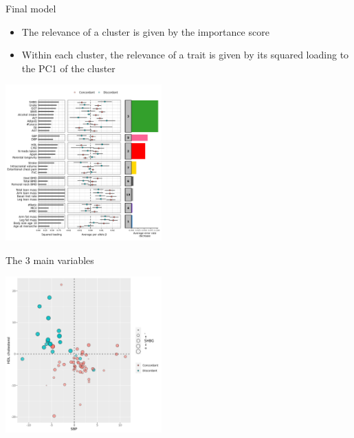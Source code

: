 \documentclass[presentation]{beamer}
\begin{document}
\begin{frame}[label={sec:orgdfdfd74}]{Final model}
\begin{itemize}
\item The relevance of a cluster is given by the importance score
\item Within each cluster, the relevance of a trait is given by its squared loading to the PC1 of the cluster
\end{itemize}
\begin{center}
\includegraphics[width=6cm]{./plots/clus_str_phen.png}
\end{center}
\end{frame}

\begin{frame}[label={sec:orgbfb703d}]{The 3 main variables}
\begin{center}
\includegraphics[width=6cm]{./plots/mainvars_phen.png}
\end{center}
\end{frame}
\end{document}
